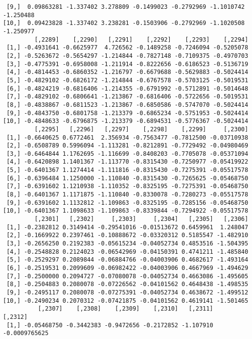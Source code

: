 \documentclass[
  letterpaper,
  DIV=11,
  numbers=noendperiod]{scrreprt}
\begin{document}
\begin{verbatim}
 [9,]  0.09863281 -1.337402 3.278809 -0.1499023 -0.2792969 -1.1010742 -1.250488
[10,]  0.09423828 -1.337402 3.238281 -0.1503906 -0.2792969 -1.1020508 -1.250977
         [,2289]    [,2290]   [,2291]    [,2292]    [,2293]    [,2294]
 [1,] -0.4931641 -0.6625977  4.726562 -0.1489258 -0.7246094 -0.5205078
 [2,] -0.5263672 -0.5654297 -1.214844 -0.7827148 -0.7109375 -0.4970703
 [3,] -0.4775391 -0.6958008 -1.211914 -0.8222656 -0.6186523 -0.5136719
 [4,] -0.4814453 -0.6860352 -1.216797 -0.6679688 -0.5629883 -0.5024414
 [5,] -0.4829102 -0.6826172 -1.214844 -0.6767578 -0.5703125 -0.5019531
 [6,] -0.4824219 -0.6816406 -1.214355 -0.6791992 -0.5712891 -0.5014648
 [7,] -0.4829102 -0.6806641 -1.213867 -0.6816406 -0.5722656 -0.5019531
 [8,] -0.4838867 -0.6811523 -1.213867 -0.6850586 -0.5747070 -0.5024414
 [9,] -0.4843750 -0.6801758 -1.213379 -0.6865234 -0.5751953 -0.5024414
[10,] -0.4848633 -0.6796875 -1.213379 -0.6894531 -0.5776367 -0.5024414
         [,2295]   [,2296]   [,2297]    [,2298]    [,2299]     [,2300]
 [1,] -0.6640625 0.6772461  2.356934 -0.7563477 -0.7812500 -0.03710938
 [2,] -0.6508789 0.5996094 -1.113281 -0.8212891 -0.7729492 -0.04980469
 [3,] -0.6464844 1.1762695 -1.116699 -0.8408203 -0.7705078 -0.05371094
 [4,] -0.6420898 1.1401367 -1.113770 -0.8315430 -0.7250977 -0.05419922
 [5,] -0.6401367 1.1274414 -1.111816 -0.8315430 -0.7275391 -0.05517578
 [6,] -0.6396484 1.1250000 -1.110840 -0.8315430 -0.7265625 -0.05468750
 [7,] -0.6391602 1.1210938 -1.110352 -0.8325195 -0.7275391 -0.05468750
 [8,] -0.6401367 1.1171875 -1.110840 -0.8330078 -0.7280273 -0.05517578
 [9,] -0.6391602 1.1132812 -1.109863 -0.8325195 -0.7285156 -0.05468750
[10,] -0.6401367 1.1098633 -1.109863 -0.8339844 -0.7294922 -0.05517578
         [,2301]   [,2302]     [,2303]     [,2304]   [,2305]   [,2306]
 [1,] -0.2382812 0.3149414 -0.29541016 -0.01513672 0.6459961  1.248047
 [2,] -0.1669922 0.2397461 -0.10888672 -0.03320312 0.5185547 -1.482910
 [3,] -0.2656250 0.2192383 -0.05615234 -0.04052734 0.4853516 -1.504395
 [4,] -0.2548828 0.2124023 -0.06542969 -0.04150391 0.4741211 -1.485840
 [5,] -0.2529297 0.2089844 -0.06884766 -0.04003906 0.4682617 -1.493164
 [6,] -0.2519531 0.2099609 -0.06982422 -0.04003906 0.4667969 -1.494629
 [7,] -0.2500000 0.2094727 -0.07080078 -0.04052734 0.4663086 -1.495605
 [8,] -0.2504883 0.2080078 -0.07226562 -0.04101562 0.4648438 -1.498535
 [9,] -0.2495117 0.2080078 -0.07275391 -0.04052734 0.4638672 -1.499512
[10,] -0.2490234 0.2070312 -0.07421875 -0.04101562 0.4619141 -1.501465
          [,2307]    [,2308]    [,2309]    [,2310]   [,2311]       [,2312]
 [1,] -0.05468750 -0.3442383 -0.9472656 -0.2172852 -1.107910 -0.0009765625

\end{verbatim}
\end{document}

